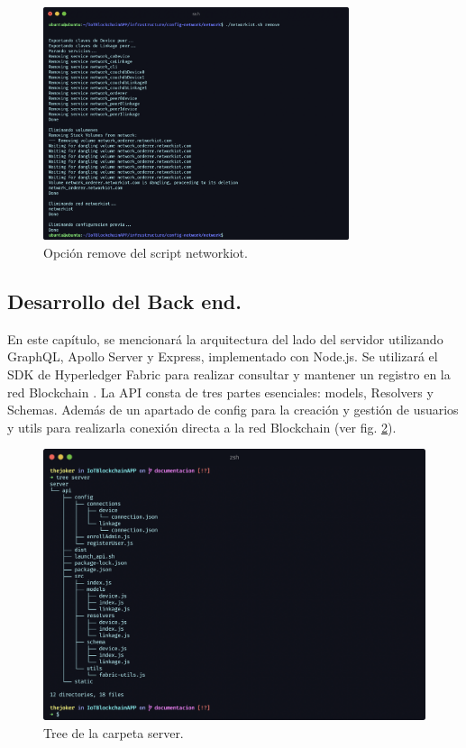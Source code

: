 \begin{figure}[ht!]
  \centering
  \includegraphics[width=0.8\textwidth]{imagenes/desarrollo/comandos/remove}
  \caption{Opción remove del script networkiot.}
  \label{fig:remove}
\end{figure}

\subsection{Desarrollo del Back end.}

En este capítulo, se mencionará la arquitectura del lado del servidor utilizando GraphQL, Apollo Server y Express, 
implementado con Node.js. Se utilizará el SDK de Hyperledger Fabric para realizar consultar y mantener un registro 
en la red Blockchain \cite{documentation-home-apollo-basics, express-docs, hyperledger-fabric-node-sdk}. La API 
consta de tres partes esenciales: models, Resolvers y Schemas. Además de un apartado de config para la creación y 
gestión de usuarios y utils para realizarla conexión directa a la red Blockchain \cite{structure-graphql-node.js} 
(ver fig. \ref{fig:tree-server}).

\begin{figure}[ht!]
  \centering
  \includegraphics[width=\textwidth]{imagenes/desarrollo/tree_server}
  \caption{Tree de la carpeta server.}
  \label{fig:tree-server}
\end{figure}

